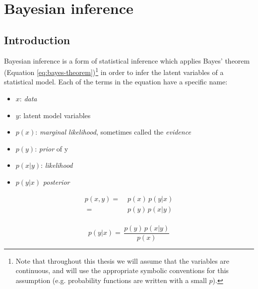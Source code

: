 \chapter{Bayesian inference}

\section{Introduction}
\par Bayesian inference is a form of statistical inference which applies Bayes' theorem (Equation \ref{eq:bayes-theorem})\footnote{Note that throughout this thesis we will assume that the variables are continuous, and will use the appropriate symbolic conventions for this assumption (e.g. probability functions are written with a small $p$).} in order to infer the latent variables of a statistical model. Each of the terms in the equation have a specific name:

\begin{itemize}
    \item     $x$: \textit{data} \vspace{-10pt}
    \item     $y$: latent model variables \vspace{-10pt}
    \item     $p(x)$: \textit{marginal likelihood}, sometimes called the \textit{evidence} \vspace{-10pt}
    \item     $p(y)$: \textit{prior} of y \vspace{-10pt}
    \item     $p(x|y)$: \textit{likelihood} \vspace{-10pt}
    \item     $p(y|x)$  \textit{posterior}
\end{itemize}

\vspace{-1cm}
\begin{equation}
    \label{eq:bayes}
    \begin{split}
        p(x, y) = \; & p(x) \, p(y|x) \\
        \; = \, & p(y) \, p(x|y) \\
    \end{split}
\end{equation}

\begin{equation} \label{eq:bayes-theorem}
    p(y|x) = \, \frac{p(y) \, p(x|y)}{p(x)}
\end{equation}

